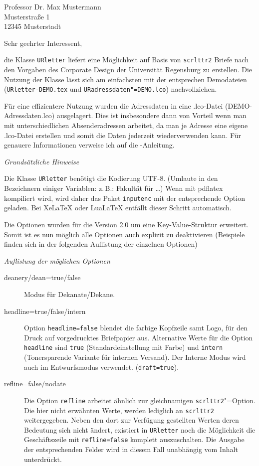 \documentclass[ngerman,parskip=half,colors={faculties,rz},headline=color]{URletter}
\newcommand*\pck[1]{\texttt{#1}}
\newcommand*\code[1]{\texttt{#1}}
\newcommand*\heading[1]{\par\bigskip\emph{#1}\par\nobreak}
\begin{document}
	

\begin{letter}{Professor Dr. Max Mustermann\\Musterstraße 1\\12345 Musterstadt}



\opening{Sehr geehrter Interessent,}

die Klasse \pck{URletter} liefert eine Möglichkeit auf Basis von \pck{scrlttr2} Briefe nach den Vorgaben des Corporate Design der Universität Regensburg zu erstellen. Die Nutzung der Klasse lässt sich am einfachsten mit der entsprechen Demodateien (\code{URletter-DEMO.tex} und \code{URadressdaten"=DEMO.lco}) nachvollziehen.

Für eine effizientere Nutzung wurden die Adressdaten in eine .lco-Datei (DEMO-Adressdaten.lco) ausgelagert. Dies ist insbesondere dann von Vorteil wenn man mit unterschiedlichen Absenderadressen arbeitet, da man je Adresse eine eigene .lco-Datei erstellen und somit die Daten jederzeit wiederverwenden kann. Für genauere Informationen verweise ich auf die \KOMAScript-Anleitung.

\heading{Grundsätzliche Hinweise}
Die Klasse \pck{URletter} benötigt die Kodierung UTF-8. (Umlaute in den Bezeichnern einiger Variablen: z.\,B.: \glqq{}Fakultät für \ldots\grqq) Wenn mit pdflatex kompiliert wird, wird daher das Paket \pck{inputenc} mit der entsprechende Option geladen. Bei Xe\LaTeX{} oder Lua\LaTeX{} entfällt dieser Schritt automatisch.

Die Optionen wurden für die Version 2.0 um eine Key-Value-Struktur erweitert. Somit ist es nun möglich alle Optionen auch explizit zu deaktivieren (Beispiele finden sich in der folgenden Auflistung der einzelnen Optionen)


\heading{Auflistung der möglichen Optionen}
\begin{description}
	\item[deanery/dean=true/false] Modus für Dekanate/Dekane.
	\item[headline=true/false/intern] Option \code{headline=false} blendet die farbige Kopfzeile samt Logo, für den Druck auf vorgedrucktes Briefpapier aus. Alternative Werte für die Option \code{headline} sind \code{true} (Standardeinstellung mit Farbe) und \code{intern} (Tonersparende Variante für internen Versand). Der Interne Modus wird auch im Entwurfsmodus verwendet. (\code{draft=true}).
	\item[refline=false/nodate] Die Option \texttt{refline} arbeitet ähnlich zur gleichnamigen \pck{scrlttr2}"=Option. Die hier nicht erwähnten Werte, werden lediglich an \pck{scrlttr2} weitergegeben. Neben den dort zur Verfügung gestellten Werten deren Bedeutung sich nicht ändert,  existiert in \pck{URletter} noch die Möglichkeit die Geschäftszeile mit \code{refline=false} komplett auszuschalten. Die Ausgabe der entsprechenden Felder wird in diesem Fall unabhängig vom Inhalt unterdrückt.
	

\end{description}
\end{letter}
\end{document}
